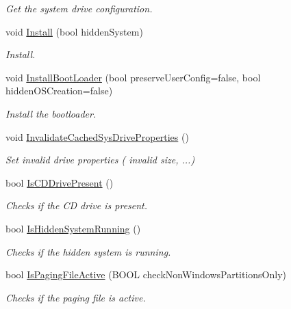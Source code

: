 \begin{DoxyCompactItemize}
\begin{DoxyCompactList}\small\item\em Get the system drive configuration. \end{DoxyCompactList}\item 
void \hyperlink{class_gost_crypt_1_1_boot_encryption_afae7ad7d8fb9fb9137395cb5e378a849}{Install} (bool hidden\+System)
\begin{DoxyCompactList}\small\item\em Install. \end{DoxyCompactList}\item 
void \hyperlink{class_gost_crypt_1_1_boot_encryption_abcddd955b7fa53811e74c7298d34268b}{Install\+Boot\+Loader} (bool preserve\+User\+Config=false, bool hidden\+O\+S\+Creation=false)
\begin{DoxyCompactList}\small\item\em Install the bootloader. \end{DoxyCompactList}\item 
void \hyperlink{class_gost_crypt_1_1_boot_encryption_ae15a4ec32e1605b7dcd5979a4334601f}{Invalidate\+Cached\+Sys\+Drive\+Properties} ()
\begin{DoxyCompactList}\small\item\em Set invalid drive properties ( invalid size, ...) \end{DoxyCompactList}\item 
bool \hyperlink{class_gost_crypt_1_1_boot_encryption_a050dbc6e24852e929a083acfdbe1d43d}{Is\+C\+D\+Drive\+Present} ()
\begin{DoxyCompactList}\small\item\em Checks if the CD drive is present. \end{DoxyCompactList}\item 
bool \hyperlink{class_gost_crypt_1_1_boot_encryption_a41ca434ce3526f63bc083f7dab6a1532}{Is\+Hidden\+System\+Running} ()
\begin{DoxyCompactList}\small\item\em Checks if the hidden system is running. \end{DoxyCompactList}\item 
bool \hyperlink{class_gost_crypt_1_1_boot_encryption_a60f1f2b0d4b4ada0e8e42eef381f515b}{Is\+Paging\+File\+Active} (B\+O\+OL check\+Non\+Windows\+Partitions\+Only)
\begin{DoxyCompactList}\small\item\em Checks if the paging file is active. \end{DoxyCompactList}\item 

\end{DoxyCompactItemize}
